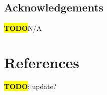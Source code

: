 \documentclass{article}
\newcommand{\TODO}{\textcolor{red}{\textbf{\hl{TODO}}}}
\begin{document}
\begin{multicols}{2}




\section{Acknowledgements} \TODO N/A

\end{multicols}

\pagebreak

\section{References} \TODO: update? \theendnotes
\end{document}
